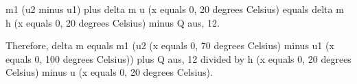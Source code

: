 m1 (u2 minus u1) plus delta m u (x equals 0, 20 degrees Celsius) equals delta m h (x equals 0, 20 degrees Celsius) minus Q aus, 12.

Therefore, delta m equals m1 (u2 (x equals 0, 70 degrees Celsius) minus u1 (x equals 0, 100 degrees Celsius)) plus Q aus, 12 divided by h (x equals 0, 20 degrees Celsius) minus u (x equals 0, 20 degrees Celsius).